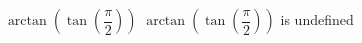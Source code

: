  {$\arctan\left(\tan\left(\dfrac{\pi}{2}\right) \right)$ }
{ $\arctan\left(\tan\left(\dfrac{\pi}{2}\right) \right)$ is undefined}
